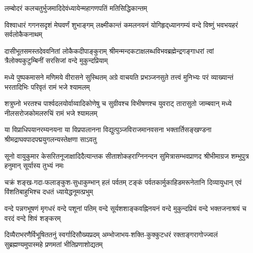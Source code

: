 {लम्बोदरं कलचतुर्भुजमादिदेवं}{ध्यायेन्महागणपतिं मतिसिद्धिकान्तम्}


{विश्वाधारं गगनसदृशं मेघवर्णं शुभाङ्गम्}
{लक्ष्मीकान्तं कमलनयनं योगिहृद्‌ध्यानगम्यं}
{वन्दे विष्णुं भवभयहरं सर्वलोकैकनाथम्}


{दासीभूतसमस्तदेववनितां लोकैकदीपाङ्कुराम्}
{श्रीमन्मन्दकटाक्षलब्धविभवब्रह्मेन्द्रगङ्गाधरां}
{त्वां त्रैलोक्यकुटुम्बिनीं सरसिजां वन्दे मुकुन्दप्रियाम्}

{मध्ये पुष्पकमासने मणिमये वीरासने सुस्थितम्}
{अग्रे वाचयति प्रभञ्जनसुते तत्त्वं मुनिभ्यः परं}
{व्याख्यान्तं भरतादिभिः परिवृतं रामं भजे श्यामलम्}

{शत्रुघ्नो भरतश्च पार्श्वदलयोर्वाय्वादिकोणेषु च}
{सुग्रीवश्च विभीषणश्च युवराट् तारासुतो जाम्बवान्}
{मध्ये नीलसरोजकोमलरुचिं रामं भजे श्यामलम्}

{या विप्राधिपयानरम्यनयना या विप्रपालानना}
{विद्युत्पुञ्जविराजमानवसना भक्तार्तिसङ्खण्डना}
{श्रीमद्राघवपादपद्मयुगलन्यस्तेक्षणा साऽवतु}

{सूनो वायुकुमार केसरितनूजाक्षादिदैत्यान्तक}
{सीताशोकहराग्निनन्दन सुमित्रासम्भवप्राणद}
{श्रीभीमाग्रज शम्भुपुत्र हनुमान् सूर्यास्य तुभ्यं नमः}

{चक्रं शङ्ख-गदा-फलाङ्कुश-सुधाकुम्भान् हलं पर्वतम्}
{टङ्कं पर्वतकार्मुकाहिडमरूनेतानि दिव्यायुधान्}
{एवं विंशतिबाहुभिश्च दधतं ध्यायेद्धनूमत्प्रभुम्}

{वन्दे पन्नगभूषणं मृगधरं वन्दे पशूनां पतिम्}
{वन्दे सूर्यशशाङ्कवह्निनयनं वन्दे मुकुन्दप्रियं}
{वन्दे भक्तजनाश्रयं च वरदं वन्दे शिवं शङ्करम्}

{दिव्यैराभरणैर्विभूषिततनुं स्वर्गादिसौख्यप्रदम्}
{अम्भोजाभय-शक्ति-कुक्कुटधरं रक्ताङ्गरागोज्ज्वलं}
{सुब्रह्मण्यमुपास्महे प्रणमतां भीतिप्रणाशोद्यतम्}

